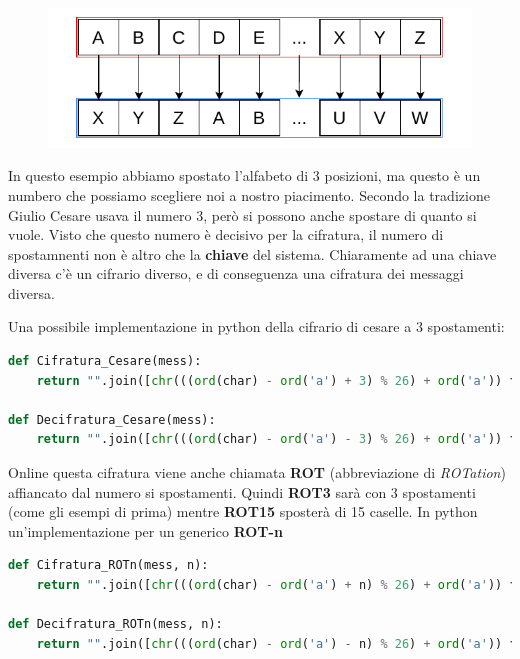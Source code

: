 \documentclass{report}
\begin{document}
\begin{figure}[h]
    \centering
    \includegraphics[width=0.8\linewidth]{logos/1_3_cripto.pdf}
\end{figure}


\newpage

In questo esempio abbiamo spostato l'alfabeto di 3 posizioni, ma questo è un numbero che possiamo scegliere noi a nostro piacimento. Secondo la tradizione Giulio Cesare usava il numero 3, però si possono anche spostare di quanto si vuole. Visto che questo numero è decisivo per la cifratura, il numero di spostamnenti non è altro che la \textbf{chiave} del sistema. Chiaramente ad una chiave diversa c'è un cifrario diverso, e di conseguenza una cifratura dei messaggi diversa. 

Una possibile implementazione in python della cifrario di cesare a 3 spostamenti:

\begin{lstlisting}[language=Python]
def Cifratura_Cesare(mess):
    return "".join([chr(((ord(char) - ord('a') + 3) % 26) + ord('a')) for a in mess])

def Decifratura_Cesare(mess):
    return "".join([chr(((ord(char) - ord('a') - 3) % 26) + ord('a')) for a in mess])
\end{lstlisting}

Online questa cifratura viene anche chiamata \textbf{ROT} (abbreviazione di \textit{ROTation}) affiancato dal numero si spostamenti. Quindi \textbf{ROT3} sarà con 3 spostamenti (come gli esempi di prima) mentre \textbf{ROT15} sposterà di 15 caselle. In python un'implementazione per un generico \textbf{ROT-n}

\begin{lstlisting}[language=Python]
def Cifratura_ROTn(mess, n):
    return "".join([chr(((ord(char) - ord('a') + n) % 26) + ord('a')) for a in mess])

def Decifratura_ROTn(mess, n):
    return "".join([chr(((ord(char) - ord('a') - n) % 26) + ord('a')) for a in mess])
\end{lstlisting}
\end{document}
